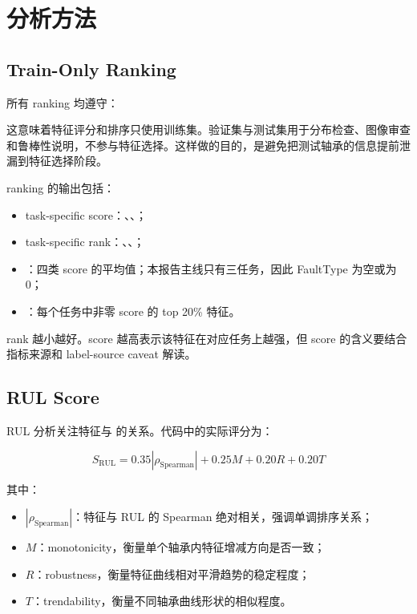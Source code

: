 \section{分析方法}

\subsection{Train-Only Ranking}

所有 ranking 均遵守：

\begin{center}
\end{center}

这意味着特征评分和排序只使用训练集。验证集与测试集用于分布检查、图像审查和鲁棒性说明，不参与特征选择。这样做的目的，是避免把测试轴承的信息提前泄漏到特征选择阶段。

ranking 的输出包括：

\begin{itemize}[leftmargin=2em]
  \item task-specific score：、、；
  \item task-specific rank：、、；
  \item {}：四类 score 的平均值；本报告主线只有三任务，因此 FaultType 为空或为 0；
  \item {}：每个任务中非零 score 的 top 20\% 特征。
\end{itemize}

rank 越小越好。score 越高表示该特征在对应任务上越强，但 score 的含义要结合指标来源和 label-source caveat 解读。

\subsection{RUL Score}

RUL 分析关注特征与  的关系。代码中的实际评分为：

\[
S_{\mathrm{RUL}} =
0.35|\rho_{\mathrm{Spearman}}|
+ 0.25M
+ 0.20R
+ 0.20T
\]

其中：

\begin{itemize}[leftmargin=2em]
  \item \(|\rho_{\mathrm{Spearman}}|\)：特征与 RUL 的 Spearman 绝对相关，强调单调排序关系；
  \item \(M\)：monotonicity，衡量单个轴承内特征增减方向是否一致；
  \item \(R\)：robustness，衡量特征曲线相对平滑趋势的稳定程度；
  \item \(T\)：trendability，衡量不同轴承曲线形状的相似程度。
\end{itemize}

